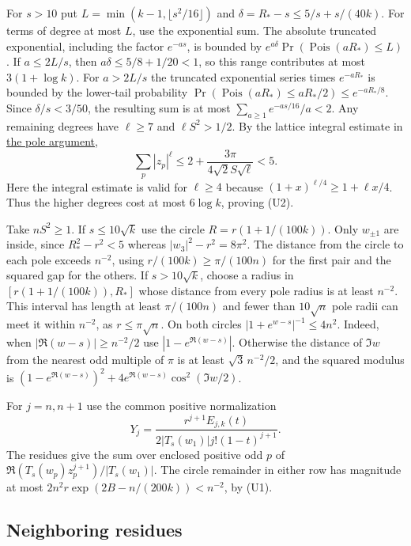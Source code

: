 For $s>10$ put $L=\min(k-1,\lfloor s^2/16\rfloor)$ and $\delta=R_*-s\le5/s+s/(40k)$. For terms of degree at most $L$, use the exponential sum. The absolute truncated exponential, including the factor $e^{-as}$, is bounded by $e^{a\delta}\Pr(\operatorname{Pois}(aR_*)\le L)$. If $a\le2L/s$, then $a\delta\le5/8+1/20<1$, so this range contributes at most $3(1+\log k)$. For $a>2L/s$ the truncated exponential series times $e^{-aR_*}$ is bounded by the lower-tail probability $\Pr(\operatorname{Pois}(aR_*)\le aR_*/2)\le e^{-aR_*/8}$. Since $\delta/s<3/50$, the resulting sum is at most $\sum_{a\ge1}e^{-as/16}/a<2$. Any remaining degrees have $\ell\ge7$ and $\ell S^2>1/2$. By the lattice integral estimate in \href{https://github.com/ProgramComputer/open-math-research/blob/main/topics/long-cycle-excedances/separated-poles.md}{the pole argument},
\[
\sum_p|z_p|^\ell\le2+\frac{3\pi}{4\sqrt2 S\sqrt\ell}<5 .
\]
Here the integral estimate is valid for $\ell\ge4$ because $(1+x)^{\ell/4}\ge1+\ell x/4$. Thus the higher degrees cost at most $6\log k$, proving (U2).

Take $nS^2\ge1$. If $s\le10\sqrt k$ use the circle $R=r(1+1/(100k))$. Only $w_{\pm1}$ are inside, since $R_*^2-r^2<5$ whereas $|w_3|^2-r^2=8\pi^2$. The distance from the circle to each pole exceeds $n^{-2}$, using $r/(100k)\ge\pi/(100n)$ for the first pair and the squared gap for the others. If $s>10\sqrt k$, choose a radius in $[r(1+1/(100k)),R_*]$ whose distance from every pole radius is at least $n^{-2}$. This interval has length at least $\pi/(100n)$ and fewer than $10\sqrt n$ pole radii can meet it within $n^{-2}$, as $r\le\pi\sqrt n$. On both circles $|1+e^{w-s}|^{-1}\le4n^2$. Indeed, when $|\Re(w-s)|\ge n^{-2}/2$ use $|1-e^{\Re(w-s)}|$. Otherwise the distance of $\Im w$ from the nearest odd multiple of $\pi$ is at least $\sqrt3\,n^{-2}/2$, and the squared modulus is $(1-e^{\Re(w-s)})^2+4e^{\Re(w-s)}\cos^2(\Im w/2)$.

For $j=n,n+1$ use the common positive normalization
\[
Y_j=\frac{r^{j+1}E_{j,k}(t)}{2|T_s(w_1)|j!(1-t)^{j+1}} .
\]
The residues give the sum over enclosed positive odd $p$ of $\Re(T_s(w_p)z_p^{j+1})/|T_s(w_1)|$. The circle remainder in either row has magnitude at most $2n^2r\exp(2B-n/(200k))<n^{-2}$, by (U1).

\subsection{Neighboring residues}

